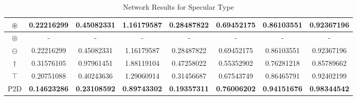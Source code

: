 \begin{table}[!h]
{\begin{tabular}{|c|c|c|c|c|c|c|c|}
			$\circledast$    & 0.22216299 & 0.45082331   & 1.16179587  & 0.28487822 & 0.69452175      & 0.86103551        & 0.92367196        \\ \hline
			$\circledcirc$   & -          & -            & -           & -          & -               & -                 & -                 \\ \hline
			$\circleddash$   & 0.22216299 & 0.45082331   & 1.16179587  & 0.28487822 & 0.69452175      & 0.86103551        & 0.92367196        \\ \hline
			$\dagger$        & 0.31576105 & 0.97961451   & 1.88119104  & 0.47258022 & 0.55352902      & 0.76281218        & 0.85789662        \\ \hline
			$\intercal$      & 0.20751088 & 0.40243636   & 1.29060914  & 0.31456687 & 0.67543749      & 0.86465791        & 0.92402199        \\ \hline
			P2D                  & \textbf{0.14623286} & \textbf{0.23108592} & \textbf{0.89743302} & \textbf{0.19357311} & \textbf{0.76006202} & \textbf{0.94151676} & \textbf{0.98344542} \\ \hline
		\end{tabular}
	}
	\caption{Network Results for Specular Type}
	\label{tab:my-table5}
\end{table}
